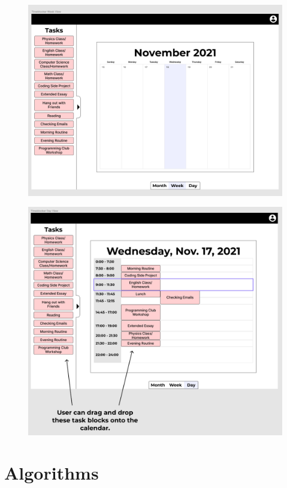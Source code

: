 \documentclass[12pt]{report}
\begin{document}
\begin{figure}[H]
\includegraphics[width=\textwidth]{week-view.png}
\end{figure}

\begin{figure}[H]
\includegraphics[width=\textwidth]{day-view.png}
\end{figure}

\newpage

\section*{Algorithms}
\end{document}
